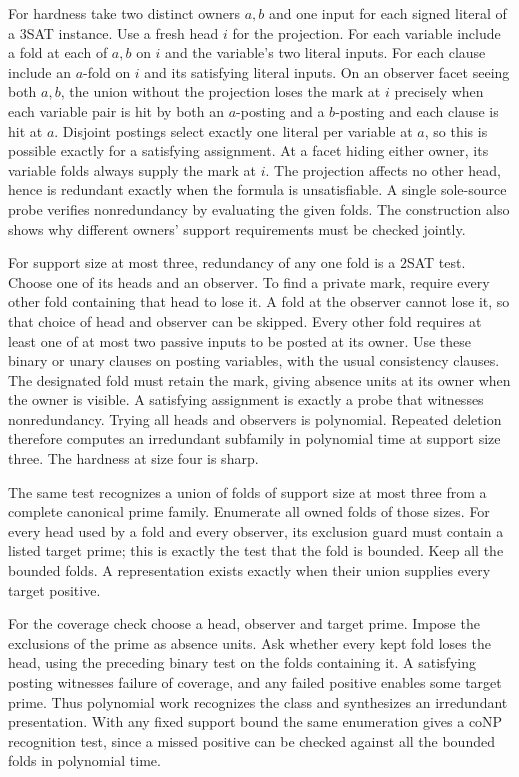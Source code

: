 For hardness take two distinct owners $a,b$ and
one input for each signed literal of a $3$SAT
instance. Use a fresh head $i$ for the projection.
For each variable include a fold at each of $a,b$
on $i$ and the variable's two literal inputs.
For each clause include an $a$-fold on $i$ and
its satisfying literal inputs. On an observer
facet seeing both $a,b$, the union without the
projection loses the mark at $i$ precisely when
each variable pair is hit by both an $a$-posting
and a $b$-posting and each clause is hit at $a$.
Disjoint postings select exactly one literal per
variable at $a$, so this is possible exactly for
a satisfying assignment. At a facet hiding
either owner, its variable folds always supply
the mark at $i$. The projection affects no
other head, hence is redundant exactly when
the formula is unsatisfiable. A single
sole-source probe verifies nonredundancy by
evaluating the given folds. The construction
also shows why different owners' support
requirements must be checked jointly.

For support size at most three, redundancy of any
one fold is a $2$SAT test. Choose one of its heads
and an observer. To find a private mark, require
every other fold containing that head to lose it.
A fold at the observer cannot lose it, so that
choice of head and observer can be skipped. Every
other fold requires at least one of at most two
passive inputs to be posted at its owner.
Use these binary or unary clauses on posting
variables, with the usual consistency clauses.
The designated fold must retain the mark, giving
absence units at its owner when the owner is
visible. A satisfying assignment is exactly a
probe that witnesses nonredundancy. Trying all
heads and observers is polynomial. Repeated
deletion therefore computes an irredundant
subfamily in polynomial time at support size
three. The hardness at size four is sharp.

The same test recognizes a union of folds of
support size at most three from a complete
canonical prime family. Enumerate all owned
folds of those sizes. For every head used by
a fold and every observer, its exclusion guard
must contain a listed target prime; this is
exactly the test that the fold is bounded.
Keep all the bounded folds. A representation
exists exactly when their union supplies every
target positive.

For the coverage check choose a head, observer
and target prime. Impose the exclusions of the
prime as absence units. Ask whether every
kept fold loses the head, using the preceding
binary test on the folds containing it.
A satisfying posting witnesses failure of
coverage, and any failed positive enables
some target prime. Thus polynomial work
recognizes the class and synthesizes an
irredundant presentation. With any fixed
support bound the same enumeration gives
a coNP recognition test, since a missed
positive can be checked against all the
bounded folds in polynomial time.

